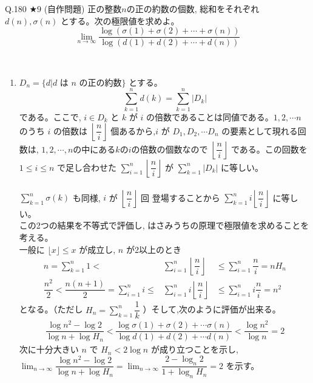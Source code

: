 \documentclass[twocolumn]{jsarticle}
\newcommand{\thm}{\begin{itembox}[l]}
\newcommand{\disp}{\displaystyle}
\newcommand{\enthm}{\end{itembox}\\}
\begin{document}
\thm{Q.180 $\bigstar 9$ (自作問題)}
正の整数$n$の正の約数の個数, 総和をそれぞれ $d(n), \sigma (n)$ とする。次の極限値を求めよ。
\[\disp\lim_{n\to \infty}\dfrac{\log{(\sigma(1) +\sigma(2) +\cdots +\sigma (n))}}{\log{(d(1)+d(2)+\cdots +d(n))}}\]
\enthm
\begin{enumerate}
\item[]$D_n=\{d| \mbox{$d$ は $n$ の正の約数}\}$ とする。
\[\displaystyle\sum_{k=1}^n d(k) = \displaystyle\sum_{k=1}^n|D_k|\] である。ここで, $i\in D_k$ と $k$ が $i$ の倍数であることは同値である。$1,2,\cdots n$ のうち $i$ の倍数は $\left\lfloor\dfrac{n}{i}\right\rfloor$ 個あるから,$i$ が $D_1, D_2, \cdots D_n$ の要素として現れる回数は, $1,2,\cdots, n$の中にある$k$の$i$の倍数の個数なので $\left\lfloor\dfrac{n}{i}\right\rfloor$ である。この回数を $1\le i\le n$ で足し合わせた $\displaystyle\sum_{i=1}^n \left\lfloor\dfrac{n}{i}\right\rfloor$ が $\displaystyle\sum_{k=1}^n |D_k|$ に等しい。 \\
\\
$\displaystyle\sum_{k=1}^n \sigma (k)$ も同様, $i$ が $\left\lfloor\dfrac{n}{i}\right\rfloor$ 回 登場することから $\displaystyle\sum_{k=1}^n i\left\lfloor\dfrac{n}{i}\right\rfloor$ に等しい。 \\
この2つの結果を不等式で評価し, はさみうちの原理で極限値を求めることを考える。\\
一般に $\lfloor x\rfloor\le x$ が成立し, $n$ が2以上のとき
\begin{eqnarray*}
n=\displaystyle\sum_{k=1}^n 1 < &\displaystyle\sum_{i=1}^n \left\lfloor\dfrac{n}{i}\right\rfloor& \le\displaystyle\sum_{i=1}^n \dfrac{n}{i}=nH_n\\
\dfrac{n^2}{2}<\dfrac{n(n+1)}{2}=
\displaystyle\sum_{i=1}^n i \le &\displaystyle\sum_{i=1}^n i\left\lfloor\dfrac{n}{i}\right\rfloor & \le \displaystyle\sum_{i=1}^n i\dfrac{n}{i} =n^2
\end{eqnarray*}
となる。（ただし $H_n=\displaystyle\sum_{k=1}^n\dfrac{1}{k}$ ）そして,次のように評価が出来る。
\begin{eqnarray*}
\dfrac{\log{n^2}-\log{2}}{\log{n}+\log{H_n}} < \dfrac{\log{\sigma(1) +\sigma (2)+\cdots \sigma (n)}}{\log{d(1)+d(2)+\cdots d(n)}} < \dfrac{\log{n^2}}{\log{n}} = 2
\end{eqnarray*}
次に十分大きい $n$ で $H_n<2\log{n}$ が成り立つことを示し,\\
$\displaystyle\lim_{n\to\infty}\dfrac{\log{n^2}-\log{2}}{\log{n}+\log{H_n}}=\displaystyle\lim_{n\to\infty}\dfrac{2-\log_n{2}}{1+\log_n{H_n}}=2$ を示す。\\
\\

\end{enumerate}
\end{document}
